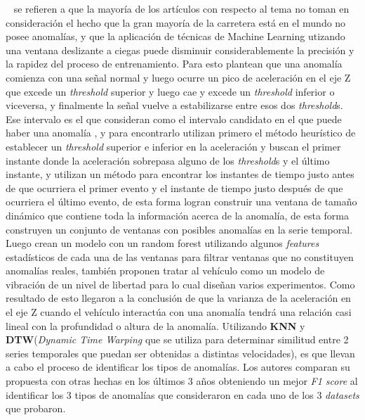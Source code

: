 ~\cite{zheng2020fused} se refieren a que la mayoría de los artículos con respecto al tema no toman en consideración el hecho que la gran mayoría de la
carretera está en el mundo no posee anomalías, y que la aplicación de técnicas de Machine Learning utizando una ventana deslizante a ciegas puede
disminuir considerablemente la precisión y la rapidez del proceso de entrenamiento. Para esto plantean que una anomalía comienza con una señal normal
y luego ocurre un pico de aceleración en el eje Z que excede un \emph{threshold} superior y luego cae y excede un \emph{threshold} inferior o viceversa,
y finalmente la señal vuelve a estabilizarse entre esos dos \emph{threshold}s. Ese intervalo es el que consideran como el intervalo candidato en el que
puede haber una anomalía , y para encontrarlo utilizan primero el método heurístico de establecer un \emph{threshold} superior e inferior en la aceleración
y buscan el primer instante donde la aceleración sobrepasa alguno de los \emph{threshold}s y el último instante, y utilizan un método para encontrar los
instantes de tiempo justo antes de que ocurriera el primer evento y el instante de tiempo justo después de que ocurriera el último evento, de esta forma
logran construir una ventana de tamaño dinámico que contiene toda la información acerca de la anomalía, de esta forma construyen un conjunto de ventanas
con posibles anomalías en la serie temporal. Luego crean un modelo con un random forest utilizando algunos \emph{features} estadísticos de cada una de las ventanas
para filtrar ventanas que no constituyen anomalías reales, también proponen tratar al vehículo como un modelo de vibración de un nivel de libertad para lo
cual diseñan varios experimentos. Como resultado de esto llegaron a la conclusión de que la varianza de la aceleración en el eje Z cuando el vehículo interactúa
con una anomalía tendrá una relación casi lineal con la profundidad o altura de la anomalía. Utilizando \textbf{KNN} y \textbf{DTW}(\emph{Dynamic Time Warping}
que se utiliza para determinar similitud entre 2 series temporales que puedan ser obtenidas a distintas velocidades), es que llevan a cabo el proceso
de identificar los tipos de anomalías. Los autores comparan su propuesta con otras hechas en los últimos 3 años obteniendo un mejor \emph{F1 score} al
identificar los 3 tipos de anomalías que consideraron en cada uno de los 3 \emph{datasets} que probaron.

